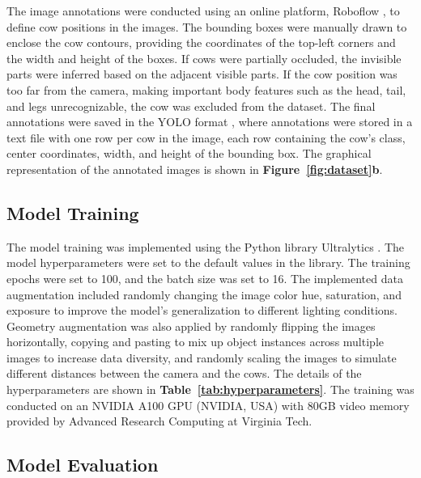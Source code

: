 The image annotations were conducted using an online platform, Roboflow \cite{roboflow2023}, to define cow positions in the images. The bounding boxes were manually drawn to enclose the cow contours, providing the coordinates of the top-left corners and the width and height of the boxes. If cows were partially occluded, the invisible parts were inferred based on the adjacent visible parts. If the cow position was too far from the camera, making important body features such as the head, tail, and legs unrecognizable, the cow was excluded from the dataset. The final annotations were saved in the YOLO format \cite{ultralytics2023datasets}, where annotations were stored in a text file with one row per cow in the image, each row containing the cow's class, center coordinates, width, and height of the bounding box. The graphical representation of the annotated images is shown in \textbf{Figure~\ref{fig:dataset}b}.

\subsection*{Model Training}

The model training was implemented using the Python library Ultralytics \cite{ultralytics}. The model hyperparameters were set to the default values in the library. The training epochs were set to 100, and the batch size was set to 16. The implemented data augmentation included randomly changing the image color hue, saturation, and exposure to improve the model's generalization to different lighting conditions. Geometry augmentation was also applied by randomly flipping the images horizontally, copying and pasting to mix up object instances across multiple images to increase data diversity, and randomly scaling the images to simulate different distances between the camera and the cows. The details of the hyperparameters are shown in \textbf{Table~\ref{tab:hyperparameters}}. The training was conducted on an NVIDIA A100 GPU (NVIDIA, USA) with 80GB video memory provided by Advanced Research Computing at Virginia Tech.

\subsection*{Model Evaluation}

